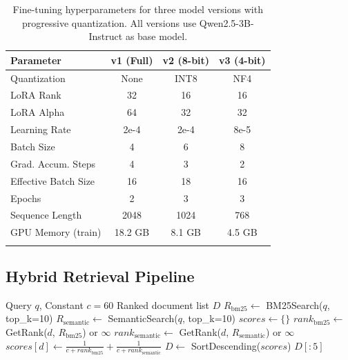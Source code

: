 \documentclass[pdflatex,sn-basic]{sn-jnl}
\begin{document}
\begin{table}[tb]
    \caption{Fine-tuning hyperparameters for three model versions with progressive quantization. All versions use Qwen2.5-3B-Instruct as base model.}
    \label{tab:hyperparameters}
    \centering
    \small
    \begin{tabular}{lccc}
        \toprule
        \textbf{Parameter} & \textbf{v1 (Full)} & \textbf{v2 (8-bit)} & \textbf{v3 (4-bit)} \\
        \midrule
        Quantization & None & INT8 & NF4 \\
        LoRA Rank & 32 & 16 & 16 \\
        LoRA Alpha & 64 & 32 & 32 \\
        Learning Rate & 2e-4 & 2e-4 & 8e-5 \\
        Batch Size & 4 & 6 & 8 \\
        Grad. Accum. Steps & 4 & 3 & 2 \\
        Effective Batch Size & 16 & 18 & 16 \\
        Epochs & 2 & 3 & 3 \\
        Sequence Length & 2048 & 1024 & 768 \\
        GPU Memory (train) & 18.2 GB & 8.1 GB & 4.5 GB \\
        \botrule
    \end{tabular}
\end{table}

\subsection{Hybrid Retrieval Pipeline}
\label{sec:method-retrieval}

\begin{algorithm}[tb]
    \caption{Reciprocal Rank Fusion (RRF) for Hybrid Retrieval}
    \label{alg:rrf}
    \begin{algorithmic}[1]
        \Require Query $q$, Constant $c=60$
        \Ensure Ranked document list $D$
        \State $R_{\text{bm25}} \gets$ BM25Search($q$, top\_k=10)
        \State $R_{\text{semantic}} \gets$ SemanticSearch($q$, top\_k=10)
        \State $scores \gets \{\}$
            \State $rank_{\text{bm25}} \gets$ GetRank($d$, $R_{\text{bm25}}$) or $\infty$
            \State $rank_{\text{semantic}} \gets$ GetRank($d$, $R_{\text{semantic}}$) or $\infty$
            \State $scores[d] \gets \frac{1}{c + rank_{\text{bm25}}} + \frac{1}{c + rank_{\text{semantic}}}$
        \EndFor
        \State $D \gets$ SortDescending($scores$)
        \State \Return $D[:5]$ 
    \end{algorithmic}
\end{algorithm}
\end{document}
